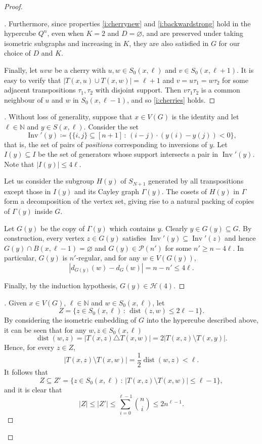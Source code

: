 \documentclass[10pt,a4paper]{amsart}
\newcommand{\Inv}{\operatorname{Inv}}
\newcommand{\dist}{\operatorname{dist}}
\renewcommand{\emptyset}{\varnothing}
\renewcommand{\geq}{\geqslant}
\renewcommand{\leq}{\leqslant}
\begin{document}
\begin{proof}
\begin{proof}[]
    Furthermore, since properties \ref{i:cherrynew} and \ref{i:backwardstrong} hold in the hypercube $Q^n$, even when $K=2$ and $D=\emptyset$, and are preserved under taking isometric subgraphs and increasing in $K$, they are also satisfied in $G$ for our choice of $D$ and $K$.

    Finally, let $uvw$ be a cherry with $u, w \in S_0(x, \ell)$ and $v \in S_0(x, \ell+1)$.
    It is easy to verify that $|T(x, u) \cup T(x, w)|=\ell+1$ and $v= u \tau_1 = w \tau_2$ for some adjacent transpositions $\tau_1, \tau_2$ with disjoint support.
    Then $v\tau_1\tau_2$ is a common neighbour of $u$ and $w$ in $S_0(x, \ell-1)$, and so \ref{i:cherries} holds.
\end{proof}

\begin{proof}[]\let\qed\relax
  Without loss of generality, suppose that $x \in V(G)$ is the identity and let $\ell \in \mathbb{N}$ and $y \in S(x,\ell)$.
  Consider the set
  \[
    \Inv'(y) \coloneqq \{\{i, j\} \subseteq [n+1] \,:\, (i-j)\cdot(y(i)-y(j)) < 0\},
  \]
  that is, the set of pairs of \emph{positions} corresponding to inversions of $y$.
  Let $I(y) \subseteq I$ be the set of generators whose support intersects a pair in $\Inv'(y)$.
  Note that $|I(y)| \leq 4 \ell$.

  Let us consider the subgroup $H(y)$ of $S_{N+1}$ generated by all transpositions except those in $I(y)$ and its Cayley graph $\Gamma(y)$.
  The cosets of $H(y)$ in $\Gamma$ form a decomposition of the vertex set, giving rise to a natural packing of copies of $\Gamma(y)$ inside $G$.

  Let $G(y)$ be the copy of $\Gamma(y)$ which contains $y$.
  Clearly $y \in G(y) \subseteq G$.
  By construction, every vertex $z \in G(y)$ satisfies $\Inv'(y) \subseteq \Inv'(z)$ and hence $G(y) \cap B(x, \ell-1)=\emptyset$ and $G(y) \in \mathcal{P}(n')$ for some $n' \geq n-4\ell$.
  In particular, $G(y)$ is $n'$-regular, and for any $w \in V(G(y))$,
  \[
    |d_{G(y)}(w) - d_G(w)|  = n-n' \leq 4\ell.
  \]

  Finally, by the induction hypothesis, $G(y) \in \mathcal{H}(4)$.
\end{proof}

\begin{proof}[]\let\qed\relax
  Given $x \in V(G)$, $\ell \in \mathbb{N}$ and $w \in S_0(x,\ell)$, let
  \[
    Z = \{ z \in S_0(x,\ell) \,:\, \dist(z,w) \leq 2\ell-1\}.
  \]
  By considering the isometric embedding of $G$ into the hypercube described above, it can be seen that for any $w,z \in S_0(x,\ell)$
  \[
    \dist(w, z) = |T(x, z) \triangle T(x,w)|=2|T(x,z) \setminus T(x,y)|.
  \]
  Hence, for every $z \in Z$,
  \[
    |T(x,z) \setminus T(x,w)| = \frac{1}{2} \dist(w, z) < \ell.
  \]
  It follows that
  \[
    Z \subseteq Z' = \{ z \in S_0(x, \ell) \,:\, |T(x,z) \setminus T(x,w)| \leq \ell-1\},
  \]
  and it is clear that
  \[
    |Z| \leq |Z'| \leq \sum_{i=0}^{\ell-1} \binom{n}{i} \leq 2n^{\ell-1}.
  \]
  \end{proof}


\end{proof}
\end{document}
